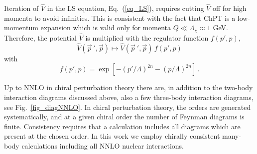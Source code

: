 Iteration of $\widehat V$ in the LS equation, Eq.~(\ref{eq_LS}),
requires cutting $\widehat V$ off for high momenta to avoid infinities.
This is consistent with the fact that ChPT
is a low-momentum expansion which
is valid only for momenta $Q \ll \Lambda_\chi \approx 1$ GeV.
Therefore, the potential $\widehat V$
is multiplied
with the regulator function $f(p',p)$,
\begin{equation}
{\widehat V}(\vec{ p}~',{\vec p})
\longmapsto
{\widehat V}(\vec{ p}~',{\vec p}) \, f(p',p) 
\end{equation}
with
\begin{equation}
f(p',p) = \exp[-(p'/\Lambda)^{2n}-(p/\Lambda)^{2n}] \,.
\label{eq:eq_f}
\end{equation}


Up to NNLO in chiral perturbation theory there are, in addition to the
two-body interaction diagrams discussed above, also a few three-body
interaction diagrams, see Fig.~\ref{fig_diagNNLO}. In
chiral perturbation theory, the orders are generated systematically,
and at a given chiral order the number of Feynman diagrams is
finite. Consistency requires that a calculation includes all diagrams
which are present at the chosen order. In this work we employ 
chirally consistent many-body calculations including all NNLO nuclear
interactions.

